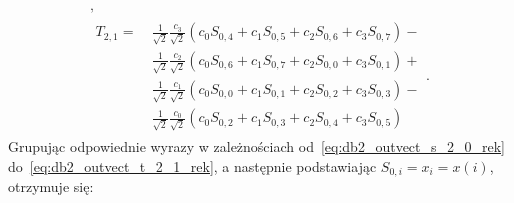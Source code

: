 \begin{gather}
\label{eq:db2_outvect_t_2_0_rek}, \\
\begin{split}
T_{2,1} =~
	& \frac{1}{\sqrt{2}} \frac{c_{3}}{\sqrt{2}} \left( c_{0} S_{0,4} + c_{1} S_{0,5} + c_{2} S_{0,6} + c_{3} S_{0,7} \right) - \\
	& \frac{1}{\sqrt{2}} \frac{c_{2}}{\sqrt{2}} \left( c_{0} S_{0,6} + c_{1} S_{0,7} + c_{2} S_{0,0} + c_{3} S_{0,1} \right) + \\
	& \frac{1}{\sqrt{2}} \frac{c_{1}}{\sqrt{2}} \left( c_{0} S_{0,0} + c_{1} S_{0,1} + c_{2} S_{0,2} + c_{3} S_{0,3} \right) - \\
	& \frac{1}{\sqrt{2}} \frac{c_{0}}{\sqrt{2}} \left( c_{0} S_{0,2} + c_{1} S_{0,3} + c_{2} S_{0,4} + c_{3} S_{0,5} \right)
\end{split}
\label{eq:db2_outvect_t_2_1_rek}.
\end{gather}
Grupując odpowiednie wyrazy w zależnościach od~\eqref{eq:db2_outvect_s_2_0_rek} do~\eqref{eq:db2_outvect_t_2_1_rek}, a następnie podstawiając $S_{0,i} = x_{i} = x(i)$, otrzymuje się:
